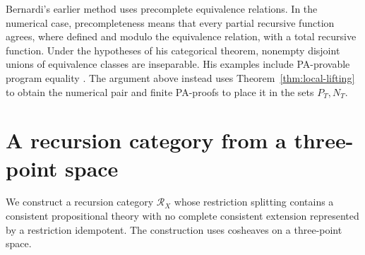 \documentclass[11pt]{article}
\begin{document}
Bernardi's earlier method uses precomplete equivalence relations.
In the numerical case, precompleteness means that every partial
recursive function agrees, where defined and modulo the equivalence
relation, with a total recursive function. Under the hypotheses of
his categorical theorem, nonempty disjoint unions of equivalence
classes are inseparable. His examples include PA-provable program
equality \cite[pp.~125--128]{Bernardi}. The argument above instead
uses Theorem~\ref{thm:local-lifting} to obtain the numerical pair and
finite PA-proofs to place it in the sets $P_T,N_T$.

\section{A recursion category from a three-point space}\label{sec:cosheaves}

We construct a recursion category $\mathscr R_X$ whose restriction
splitting contains a consistent propositional theory with no complete
consistent extension represented by a restriction idempotent.
The construction uses cosheaves on a three-point space.
\end{document}
